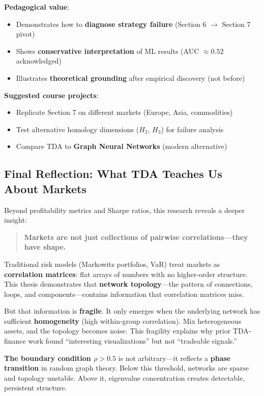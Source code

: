 \textbf{Pedagogical value}:
\begin{itemize}
\item Demonstrates how to \textbf{diagnose strategy failure} (Section 6 $\rightarrow$ Section 7 pivot)
\item Shows \textbf{conservative interpretation} of ML results (AUC $\approx 0.52$ acknowledged)
\item Illustrates \textbf{theoretical grounding} after empirical discovery (not before)
\end{itemize}

\textbf{Suggested course projects}:
\begin{itemize}
\item Replicate Section 7 on different markets (Europe, Asia, commodities)
\item Test alternative homology dimensions ($H_2$, $H_3$) for failure analysis
\item Compare TDA to \textbf{Graph Neural Networks} (modern alternative)
\end{itemize}

\subsection{Final Reflection: What TDA Teaches Us About Markets}

Beyond profitability metrics and Sharpe ratios, this research reveals a deeper insight:

\begin{quote}
\textbf{Markets are not just collections of pairwise correlations---they have shape.}
\end{quote}

Traditional risk models (Markowitz portfolios, VaR) treat markets as \textbf{correlation matrices}: flat arrays of numbers with no higher-order structure. This thesis demonstrates that \textbf{network topology}---the pattern of connections, loops, and components---contains information that correlation matrices miss.

But that information is \textbf{fragile}. It only emerges when the underlying network has sufficient \textbf{homogeneity} (high within-group correlation). Mix heterogeneous assets, and the topology becomes noise. This fragility explains why prior TDA-finance work found ``interesting visualizations'' but not ``tradeable signals.''

\textbf{The boundary condition $\rho > 0.5$} is not arbitrary---it reflects a \textbf{phase transition} in random graph theory. Below this threshold, networks are sparse and topology unstable. Above it, eigenvalue concentration creates detectable, persistent structure.

